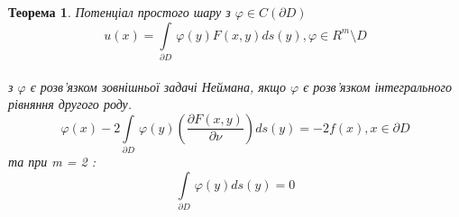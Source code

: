 \documentclass[a4 paper,12pt,ukrainian]{report}
\newtheorem{theorem}{\textbf{Теорема}}[chapter]
\begin{document}
\begin{theorem}
Потенціал простого шару з $\varphi \in C(\partial D)$
\begin{equation*}
u(x) = \int\limits_{\partial D} \, \varphi(y) F(x,y)ds(y), \varphi \in R^m \setminus D
\end{equation*}
\\ з $\varphi$ є розв'язком зовнішньої задачі Неймана, якщо $\varphi$ є розв'язком інтегрального рівняння другого роду.
\begin{equation}
\varphi(x) - 2\int\limits_{\partial D} \, \varphi(y) (\frac{\partial F(x,y)}{\partial \nu})ds(y) = -2f(x), x \in \partial D
\end{equation}
та при m = 2 :
\begin{equation}
\int\limits_{\partial D} \, \varphi(y) ds(y) = 0
\end{equation}
\end{theorem}
\end{document}
